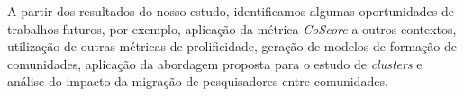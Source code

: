 \documentclass[12pt]{article}
\begin{document}
A partir dos resultados do nosso estudo, identificamos algumas oportunidades 
de trabalhos futuros, por exemplo, aplicação da métrica \textit{CoScore} a 
outros contextos, utilização de outras métricas de prolificidade, geração de 
modelos de formação de comunidades, aplicação da abordagem proposta 
para o estudo de \textit{clusters} e análise do impacto da migração de 
pesquisadores entre comunidades.



\end{document}
